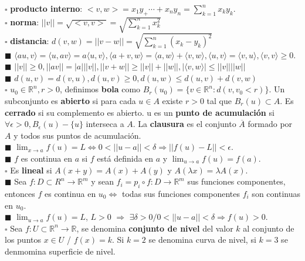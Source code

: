 \documentclass[11pt,a4paper]{article}
\begin{document}
$\square$ \textbf{producto interno}: $<v,w> = x_1y_+ \cdots + x_ny_n = \sum_{k=1}^n x_ky_k$. \\
$\square$ \textbf{norma}: $||v|| = \sqrt{<v,v>} = \sqrt{\sum_{k=1}^n x_k^2}$ \\
$\square$ \textbf{distancia}: $d(v,w) = ||v-w|| = \sqrt{\sum_{k=1}^n (x_k-y_k)^2}$ \\
$\blacksquare$ $\langle au,v\rangle = \langle u,av\rangle = a\langle u,v\rangle, \langle a+v, w\rangle = \langle a,w\rangle + \langle v,w\rangle, \langle u,v\rangle = \langle v,u\rangle, \langle v,v\rangle \geq 0$.\\
$\blacksquare$ $||v|| \geq 0, ||av|| = |a|||v||, ||v+w|| \geq ||v||+||w||, |\langle v,w \rangle| \leq ||v||||w||$\\
$\blacksquare$ $d(u,v) = d(v,u), d(u,v) \geq 0, d(u,w) \leq d(u,v) + d(v,w)$\\
$\square$ $u_0 \in \mathbb{R}^n, r>0$, definimos \textbf{bola} como $B_r(u_0) = \{v \in \mathbb{R}^n : d(v,v_0 < r)\}$. Un subconjunto es \textbf{abierto} si para cada $u \in A$  existe $r> 0$ tal que $B_r(u) \subset A$. Es \textbf{cerrado} si su complemento es abierto. u es un \textbf{punto de acumulaci\'on} si $\forall \epsilon > 0, B_\epsilon(u) - \{ u \}$ interseca a $A$. La \textbf{clausura} es el conjunto $\overline{A}$ formado por $A$ y todos sus puntos de acumulaci\'on. \\
$\blacksquare$ $\lim_{x \to a}f(u) = L \iff 0 <  ||u-a|| < \delta \Rightarrow ||f(u) - L|| < \epsilon$.\\
$\blacksquare$ $f$ es continua en $a$ si $f$ est\'a definida en $a$ y $\lim_{u \to a} f(u) = f(a)$.\\
$\square$ Es \textbf{lineal} si $A(x+y) = A(x) + A(y)$ y $A(\lambda x) = \lambda A(x)$.\\
$\blacksquare$ Sea $f : D \subset R^n \rightarrow \mathbb{R}^m$ y sean $f_i = p_i \circ f : D \rightarrow \mathbb{R}^m$ sus funciones componentes, entonces $f$ es continua en $u_0 \iff $ todas sus funciones componentes $f_i$ son continuas en $u_0$.\\
$\blacksquare$ $\lim_{u \to a} f(u) = L$, $L>0$ $\Rightarrow$ $\exists \delta > 0 / 0 < ||u-a|| < \delta \Rightarrow f(u) > 0$.\\
$\square$ Sea $f : U \subset \mathbb{R}^n \rightarrow \mathbb{R}$, se denomina \textbf{conjunto de nivel} del valor $k$ al conjunto de los puntos $x \in U$ / $f(x)=k$. Si $k = 2$ se denomina curva de nivel, si $k = 3$ se denmomina superficie de nivel.\\
\end{document}
